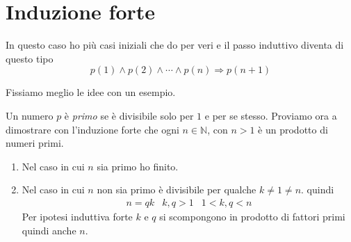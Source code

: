 \section{Induzione forte}
In questo caso ho pi\`u casi iniziali che do per veri e il passo induttivo diventa di questo
tipo
\begin{equation*}
	p(1) \wedge p(2) \wedge \cdots \wedge p(n) \Rightarrow p(n + 1)
\end{equation*}

Fissiamo meglio le idee con un esempio.

\begin{example}
	Un numero $p$ \`e \emph{primo} se \`e divisibile solo per $1$ e per se stesso.
	Proviamo ora a dimostrare con l'induzione forte che ogni $n \in \mathbb{N}$, con $n > 1$
	\`e un prodotto di numeri primi.
	\begin{enumerate}
		\item Nel caso in cui $n$ sia primo ho finito.
		\item Nel caso in cui $n$ non sia primo \`e divisibile per qualche $k \neq 1 \neq n$.
		      quindi
		      \begin{equation*}
			      \begin{array}{lcr}
				      n = qk & k, q > 1 & 1 < k, q < n
			      \end{array}
		      \end{equation*}
		      Per ipotesi induttiva forte $k$ e $q$ si scompongono in prodotto di fattori primi
		      quindi anche $n$.
	\end{enumerate}
\end{example}

